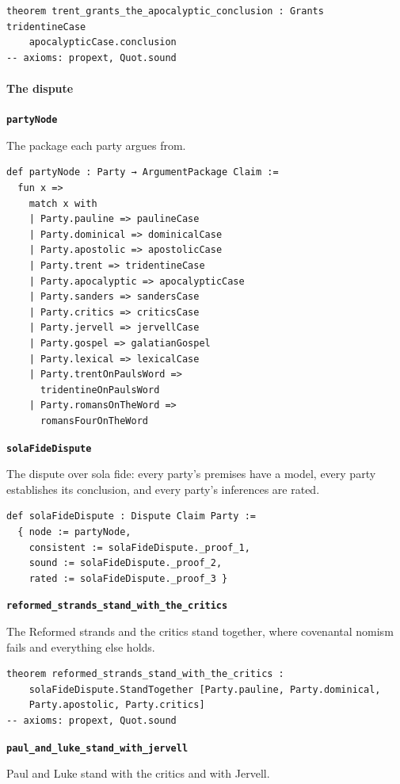 \documentclass[11pt]{article}
\begin{document}
{\small\begin{verbatim}
theorem trent_grants_the_apocalyptic_conclusion : Grants tridentineCase
    apocalypticCase.conclusion
-- axioms: propext, Quot.sound
\end{verbatim}}
\paragraph*{The dispute}
\leavevmode\par
\par\medskip\noindent\textbf{\texttt{party\allowbreak{}Node}}\par\nobreak\noindent
The package each party argues from.

{\small\begin{verbatim}
def partyNode : Party → ArgumentPackage Claim :=
  fun x =>
    match x with
    | Party.pauline => paulineCase
    | Party.dominical => dominicalCase
    | Party.apostolic => apostolicCase
    | Party.trent => tridentineCase
    | Party.apocalyptic => apocalypticCase
    | Party.sanders => sandersCase
    | Party.critics => criticsCase
    | Party.jervell => jervellCase
    | Party.gospel => galatianGospel
    | Party.lexical => lexicalCase
    | Party.trentOnPaulsWord =>
      tridentineOnPaulsWord
    | Party.romansOnTheWord =>
      romansFourOnTheWord
\end{verbatim}}
\par\medskip\noindent\textbf{\texttt{sola\allowbreak{}Fide\allowbreak{}Dispute}}\par\nobreak\noindent
The dispute over sola fide: every party's premises have a model, every party establishes its conclusion, and every party's inferences are rated.

{\small\begin{verbatim}
def solaFideDispute : Dispute Claim Party :=
  { node := partyNode,
    consistent := solaFideDispute._proof_1,
    sound := solaFideDispute._proof_2,
    rated := solaFideDispute._proof_3 }
\end{verbatim}}
\par\medskip\noindent\textbf{\texttt{reformed\_\allowbreak{}strands\_\allowbreak{}stand\_\allowbreak{}with\_\allowbreak{}the\_\allowbreak{}critics}}\par\nobreak\noindent
The Reformed strands and the critics stand together, where covenantal nomism fails and everything else holds.

{\small\begin{verbatim}
theorem reformed_strands_stand_with_the_critics :
    solaFideDispute.StandTogether [Party.pauline, Party.dominical,
    Party.apostolic, Party.critics]
-- axioms: propext, Quot.sound
\end{verbatim}}
\par\medskip\noindent\textbf{\texttt{paul\_\allowbreak{}and\_\allowbreak{}luke\_\allowbreak{}stand\_\allowbreak{}with\_\allowbreak{}jervell}}\par\nobreak\noindent
Paul and Luke stand with the critics and with Jervell.
\end{document}
